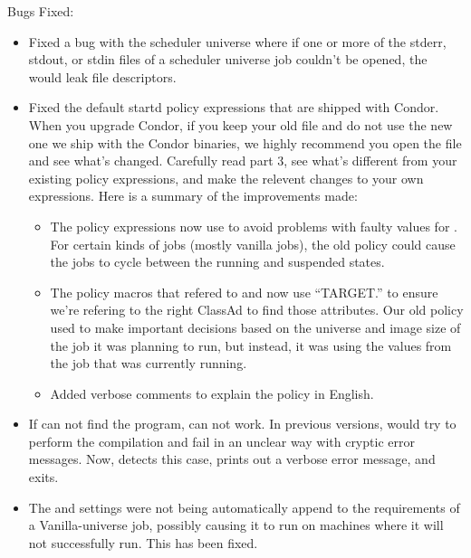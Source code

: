 \noindent Bugs Fixed:
\begin{itemize}

\item Fixed a bug with the scheduler universe where if one or more of
the stderr, stdout, or stdin files of a scheduler universe job couldn't
be opened, the  would leak file descriptors.

\item Fixed the default startd policy expressions that are shipped
with Condor.
When you upgrade Condor, if you keep your old 
file and do not use the new one we ship with the Condor binaries, we
highly recommend you open the 
file and see what's changed.
Carefully read part 3, see what's different from your existing policy
expressions, and make the relevent changes to your own expressions.
Here is a summary of the improvements made:
\begin{itemize}
  \item The policy expressions now use  to avoid
  problems with faulty values for .
  For certain kinds of jobs (mostly vanilla jobs), the old policy
  could cause the jobs to cycle between the running and suspended
  states.
  \item The policy macros that refered to  and
   now use ``TARGET.'' to ensure we're refering to the
  right ClassAd to find those attributes.
  Our old policy used to make important decisions based on the
  universe and image size of the job it was planning to run, but
  instead, it was using the values from the job that was currently
  running.
  \item Added verbose comments to explain the policy in English.
\end{itemize}

\item If  can not find the 
program,  can not work.
In previous versions,   would try to perform the
compilation and fail in an unclear way with cryptic error messages. 
Now,  detects this case, prints out a verbose error
message, and exits.

\item The  and  settings were
not being automatically append to the requirements of a Vanilla-universe job,
possibly causing it to run on machines where it will not successfully run. This
has been fixed.


\end{itemize}
